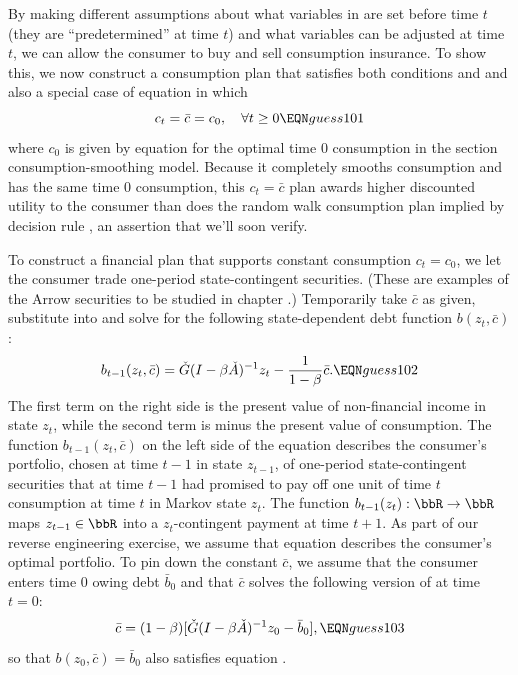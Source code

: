 By making different assumptions about what variables in   are set before time $t$ (they are  ``predetermined'' at time $t$)
and what variables can  be adjusted  at time $t$, we can allow the consumer to buy and sell consumption
insurance. To show this, we now  construct a  consumption plan that satisfies both conditions  and  and also  a special case of  equation  in which
$$ c_t = \bar c  = c_0 , \quad \forall t \geq 0 \EQN guess101 $$
where  $c_0$ is given by equation   for  the  optimal time $0$ consumption
in the section   consumption-smoothing model.    Because it  completely smooths consumption and has
the same time $0$ consumption,
this  $c_t = \bar c$ plan awards higher discounted utility to the consumer
than does  the random walk consumption plan
implied by decision rule , an assertion that we'll soon verify.

 To construct a financial plan that supports constant consumption $c_t = c_0$, we let the consumer trade one-period state-contingent securities. (These are examples of the  
  Arrow securities  to be studied in chapter .)  Temporarily take $\bar c$ as given, substitute  into
 and solve for the following state-dependent debt function $b(z_t, \bar c)$:
$$ b_{t-1}(z_t, \bar c) =  \check G(I-\beta \check A)^{-1} z_t - {\frac{1}{1-\beta}} \bar c . \EQN guess102 $$
The first term on the right side is the present value of non-financial income in state $z_t$, while the 
second term is minus the present value of consumption.  The function $b_{t-1}(z_t, \bar c)$ on the left side of the equation describes the consumer's  portfolio, chosen  at time $t-1$ in state $z_{t-1}$,  
of one-period state-contingent securities  that at time $t-1$ had promised to  pay  off one unit of  time $t$ consumption at time $t$ in Markov state $z_t$. The function  $b_{t-1}(z_{t}): \bbR \rightarrow \bbR$ maps $z_{t-1} \in 
\bbR$ into a $z_{t}$-contingent payment at time $t+1$. As part of  our reverse engineering exercise, we assume that equation  describes the  consumer's optimal portfolio. 
To pin down the constant $\bar c$, we assume that the consumer enters time $0$ owing debt $\bar b_0$ and that 
$\bar c$ solves  the following version of  at time $t=0$:
$$ \bar c = (1 -\beta) [ \check G(I-\beta \check A)^{-1} z_0 -  \bar b_0 ] , \EQN guess103 $$
so that $b(z_0, \bar c) = \bar b_0$ also satisfies equation .

